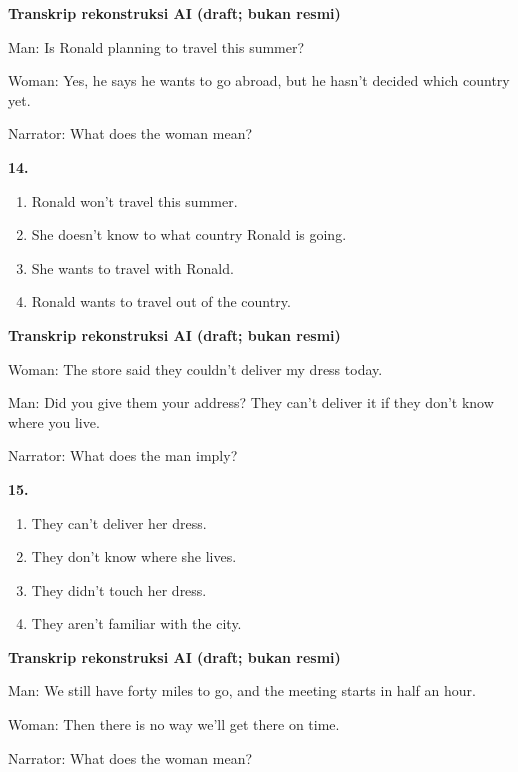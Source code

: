 \documentclass[12pt]{article}
\begin{document}
\par
\vspace{0.25\baselineskip}
\begin{exampleblock}
\textbf{Transkrip rekonstruksi AI (draft; bukan resmi)}\par
Man: Is Ronald planning to travel this summer?\par
Woman: Yes, he says he wants to go abroad, but he hasn't decided which country yet.\par
Narrator: What does the woman mean?\par
\end{exampleblock}
\noindent\textbf{14.}
\begin{enumerate}[label=(\Alph*),leftmargin=*,itemsep=0.2em]
\item Ronald won't travel this summer.
\item She doesn't know to what country Ronald is going.
\item She wants to travel with Ronald.
\item Ronald wants to travel out of the country.
\end{enumerate}
\par
\vspace{0.25\baselineskip}
\begin{exampleblock}
\textbf{Transkrip rekonstruksi AI (draft; bukan resmi)}\par
Woman: The store said they couldn't deliver my dress today.\par
Man: Did you give them your address? They can't deliver it if they don't know where you live.\par
Narrator: What does the man imply?\par
\end{exampleblock}
\noindent\textbf{15.}
\begin{enumerate}[label=(\Alph*),leftmargin=*,itemsep=0.2em]
\item They can't deliver her dress.
\item They don't know where she lives.
\item They didn't touch her dress.
\item They aren't familiar with the city.
\end{enumerate}
\par
\vspace{0.25\baselineskip}
\begin{exampleblock}
\textbf{Transkrip rekonstruksi AI (draft; bukan resmi)}\par
Man: We still have forty miles to go, and the meeting starts in half an hour.\par
Woman: Then there is no way we'll get there on time.\par
Narrator: What does the woman mean?\par
\end{exampleblock}
\end{document}
